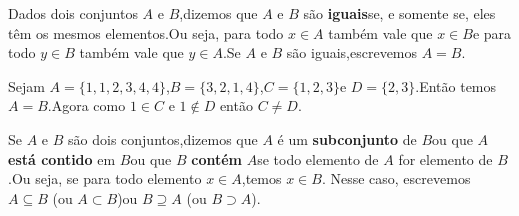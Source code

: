 \documentclass{beamer}
\begin{document}
    \begin{frame}
        \begin{definicao}
            Dados dois conjuntos $A$ e $B$,\pause dizemos que $A$ e $B$ s{\~a}o \textbf{iguais}\pause se, e somente se, eles t{\^e}m os mesmos elementos.\pause Ou seja, para todo $x \in A$ também vale que $x \in B$\pause e para todo $y \in B$ também vale que $y \in A$.\pause Se $A$ e $B$ s{\~a}o iguais,\pause escrevemos $A = B$.\pause
        \end{definicao}

        \begin{exemplo}
            Sejam $A = \{1,1,2,3,4,4\}$,\pause $B = \{3,2,1,4\}$,\pause $C = \{1,2,3\}$\pause e $D = \{2,3\}$.\pause Ent\~ao temos $A = B$.\pause Agora como $1 \in C$ e $1 \notin D$ ent\~ao $C \ne D$.\pause
        \end{exemplo}
            
        \begin{definicao}
            Se $A$ e $B$ s{\~a}o dois conjuntos,\pause dizemos que $A$ {\'e} um \textbf{subconjunto} de $B$\pause ou que $A$ \textbf{est\'a contido} em $B$\pause ou que $B$ \textbf{cont\'em} $A$\pause se todo elemento de $A$ for elemento de $B$.\pause Ou seja, se para todo elemento $x \in A$,\pause temos $x \in B$. \pause Nesse caso, escrevemos $A \subseteq B$ (ou $A \subset B$)\pause ou $B \supseteq A$ (ou $B \supset A$).\pause
        \end{definicao}
    \end{frame}
\end{document}
